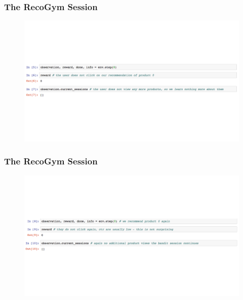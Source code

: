  \begin{frame}
  \frametitle{The RecoGym Session}
 
 
   \begin{figure}[h!]
     \includegraphics[scale=0.3]{images/reco_gym_sess1.png}
       \centering
       \label{motex1}
   \end{figure}
     
 \end{frame}



 \begin{frame}
  \frametitle{The RecoGym Session}
 
 
   \begin{figure}[h!]
     \includegraphics[scale=0.3]{images/reco_gym_sess2.png}
       \centering
       \label{motex1}
   \end{figure}
     
 \end{frame}



